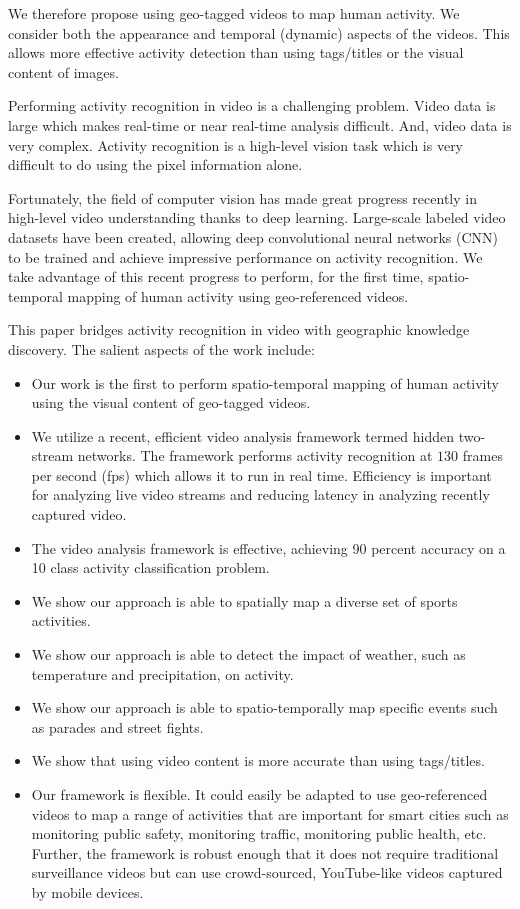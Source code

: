 \documentclass[sigconf]{acmart}
\begin{document}
	We therefore propose using geo-tagged videos to map human activity. We consider both the appearance and temporal (dynamic) aspects of the videos. This allows more effective activity detection than using tags/titles or the visual content of images.
	
	Performing activity recognition in video is a challenging problem. Video data is large which makes real-time or near real-time analysis difficult. And, video data is very complex. Activity recognition is a high-level vision task which is very difficult to do using the pixel information alone.
	
	Fortunately, the field of computer vision has made great progress recently in high-level video understanding thanks to deep learning. Large-scale labeled video datasets \cite{ucf101,activityNet,KarpathyCVPR14,YouTube_8M_2016} have been created, allowing deep convolutional neural networks (CNN) to be trained and achieve impressive performance on activity recognition. We take advantage of this recent progress to perform, for the first time, spatio-temporal mapping of human activity using geo-referenced videos.
	
	This paper bridges activity recognition in video with geographic knowledge discovery. The salient aspects of the work include:
	
	\begin{itemize}
		\item Our work is the first to perform spatio-temporal mapping of human activity using the visual content of geo-tagged videos.
		\item We utilize a recent, efficient video analysis framework termed hidden two-stream networks. The framework performs activity recognition at $130$ frames per second (fps) which allows it to run in real time. Efficiency is important for analyzing live video streams and reducing latency in analyzing recently captured video.
		\item The video analysis framework is effective, achieving 90 percent accuracy on a 10 class activity classification problem.
		\item We show our approach is able to spatially map a diverse set of sports activities.
		\item We show our approach is able to detect the impact of weather, such as temperature and precipitation, on activity.
		\item We show our approach is able to spatio-temporally map specific events such as parades and street fights.
		\item We show that using video content is more accurate than using tags/titles.
		\item Our framework is flexible. It could easily be adapted to use geo-referenced videos to map a range of activities that are important for smart cities such as monitoring public safety, monitoring traffic, monitoring public health, etc. Further, the framework is robust enough that it does not require traditional surveillance videos but can use crowd-sourced, YouTube-like videos captured by mobile devices.
	\end{itemize}
	
\end{document}
